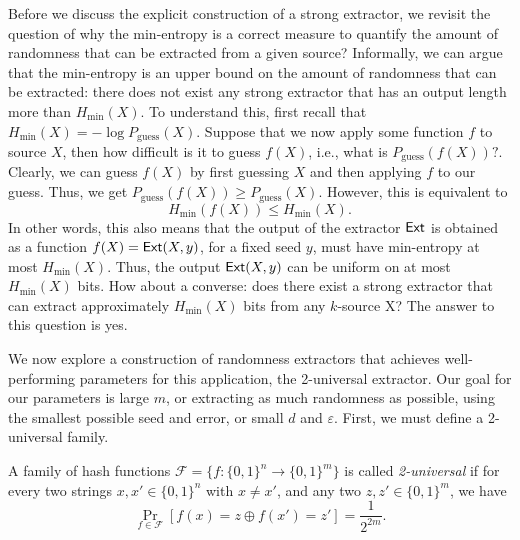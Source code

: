 Before we discuss the explicit construction of a strong extractor, we revisit the question of why the min-entropy is a correct measure to quantify the amount of randomness that can be extracted from a given source? Informally, we can argue that the min-entropy is an upper bound on the amount of randomness that can be extracted: there does not exist any strong extractor that has an output length more than $H_{\min}(X)$. To understand this, first recall that $H_{\min}(X) = - \log P_{\text{guess}}(X)$. Suppose that we now apply some function $f$ to source $X$, then how difficult is it to guess $f(X)$, i.e., what is $P_{\text{guess}}(f(X))?$. Clearly, we can guess $f(X)$ by first guessing $X$ and then applying $f$ to our guess. Thus, we get $P_{\text{guess}}(f(X))\geq P_{\text{guess}}(X)$. However, this is equivalent to
\[H_{\min}(f(X))\leq H_{\min}(X).\]
In other words, this also means that the output of the extractor $\mathsf{Ext}$ is obtained as a function
$f(X) = \mathsf{Ext}(X,y)$, for a fixed seed $y$, must have min-entropy at most $H_{\min}(X)$. Thus, the output $\mathsf{Ext}(X,y)$ can be uniform on at most $H_{\min}(X)$ bits.
How about a converse: does there exist a strong extractor that can extract approximately $H_{\min}(X)$ bits from any $k$-source X? The answer to this question is yes.

We now explore a construction of randomness extractors that achieves well-performing parameters for this application, the 2-universal extractor. Our goal for our parameters is large $m$, or extracting as much randomness as possible, using the smallest possible seed and error, or small $d$ and $\varepsilon$. First, we must define a 2-universal family.
\begin{definition}
    A family of hash functions $\mathcal{F} = \{f:\{0,1\}^n \rightarrow \{0,1\}^m\}$ is called \textit{2-universal} if for every two strings $x,x' \in \{0,1\}^n$ with $x \neq x'$, and any two $z, z' \in \{0,1\}^m$, we have
    \[
        \Pr_{f \in \mathcal{F}}[f(x) = z \oplus f(x') = z'] = \frac{1}{2^{2m}}.
    \]
\end{definition}

